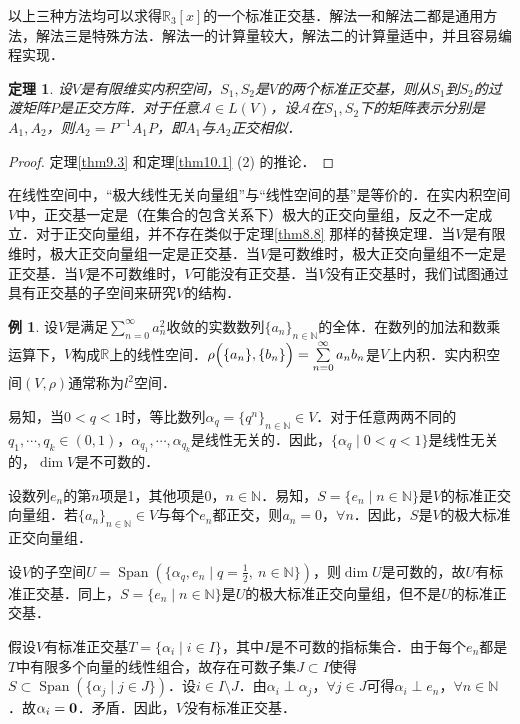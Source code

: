 \documentclass[a4paper,fontset=windows]{ctexbook}
\newtheorem{theorem}{定理}[chapter]
\theoremstyle{definition}
\newtheorem{example}{例}[chapter]
\DeclareMathOperator{\Span}{Span}
\def\note{\noindent\raisebox{10pt}{\dbend}\hspace{7pt}}
\begin{document}
\note 以上三种方法均可以求得$\mathbb{R}_3[x]$的一个标准正交基．解法一和解法二都是通用方法，解法三是特殊方法．解法一的计算量较大，解法二的计算量适中，并且容易编程实现．

\begin{theorem}\label{thm10.4}
设$V$是有限维实内积空间，$S_1,S_2$是$V$的两个标准正交基，则从$S_1$到$S_2$的过渡矩阵$P$是正交方阵．对于任意$\mathcal{A}\in L(V)$，设$\mathcal{A}$在$S_1,S_2$下的矩阵表示分别是$A_1,A_2$，则$A_2=P^{-1}A_1P$，即$A_1$与$A_2$正交相似．
\end{theorem}

\begin{proof}
定理\ref{thm9.3} 和定理\ref{thm10.1} (2) 的推论．
\end{proof}

在线性空间中，“极大线性无关向量组”与“线性空间的基”是等价的．在实内积空间$V$中，正交基一定是（在集合的包含关系下）极大的正交向量组，反之不一定成立．对于正交向量组，并不存在类似于定理\ref{thm8.8} 那样的替换定理．当$V$是有限维时，极大正交向量组一定是正交基．当$V$是可数维时，极大正交向量组不一定是正交基．当$V$是不可数维时，$V$可能没有正交基．当$V$没有正交基时，我们试图通过具有正交基的子空间来研究$V$的结构．

\begin{example}\label{ex10.11}
设$V$是满足$\sum\limits_{n=0}^\infty a_n^2$收敛的实数数列$\{a_n\}_{n\in\mathbb{N}}$的全体．在数列的加法和数乘运算下，$V$构成$\mathbb{R}$上的线性空间．$\rho\Bigl(\{a_n\},\{b_n\}\Bigr)=\sum\limits_{n=0}^\infty a_nb_n$是$V$上内积．实内积空间$(V,\rho)$通常称为$l^2$空间．

易知，当$0<q<1$时，等比数列$\alpha_q=\{q^n\}_{n\in\mathbb{N}}\in V$．对于任意两两不同的$q_1,\cdots,q_k\in(0,1)$，$\alpha_{q_1},\cdots,\alpha_{q_k}$是线性无关的．因此，$\{\alpha_q\mid 0<q<1\}$是线性无关的，$\dim V$是不可数的．

设数列$e_n$的第$n$项是1，其他项是0，$n\in\mathbb{N}$．易知，$S=\{e_n\mid n\in\mathbb{N}\}$是$V$的标准正交向量组．若$\{a_n\}_{n\in\mathbb{N}}\in V$与每个$e_n$都正交，则$a_n=0$，$\forall n$．因此，$S$是$V$的极大标准正交向量组．

设$V$的子空间$U=\Span(\{\alpha_q,e_n\mid q=\frac{1}{2},~n\in\mathbb{N}\})$，则$\dim U$是可数的，故$U$有标准正交基．同上，$S=\{e_n\mid n\in\mathbb{N}\}$是$U$的极大标准正交向量组，但不是$U$的标准正交基．

假设$V$有标准正交基$T=\{\alpha_i\mid i\in I\}$，其中$I$是不可数的指标集合．由于每个$e_n$都是$T$中有限多个向量的线性组合，故存在可数子集$J\subset I$使得$S\subset\Span(\{\alpha_j\mid j\in J\})$．设$i\in I\setminus J$．由$\alpha_i\perp\alpha_j$，$\forall j\in J$可得$\alpha_i\perp e_n$，$\forall n\in\mathbb{N}$．故$\alpha_i={\bf 0}$．矛盾．因此，$V$没有标准正交基．
\end{example}
\end{document}
